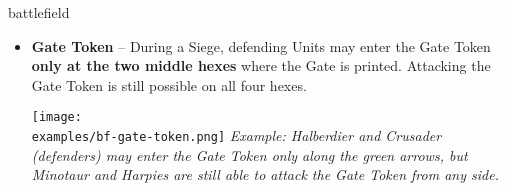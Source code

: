 \begin{expansion}{battlefield}
\begin{multicols*}{2}
\begin{itemize}
    \item \textbf{Gate Token} – During a Siege, defending Units may enter the Gate Token \textbf{only at the two middle hexes} where the Gate is printed.
    Attacking the Gate Token is still possible on all four hexes.

    \vspace*{1em}
    \texttt{[image: \\examples/bf-gate-token.png]}
    \footnotesize\textit{Example: Halberdier and Crusader (defenders) may enter the Gate Token only along the green arrows, but Minotaur and Harpies are still able to attack the Gate Token from any side.}
  \end{itemize}
    \vspace*{\fill}
  \end{multicols*}
\end{expansion}

